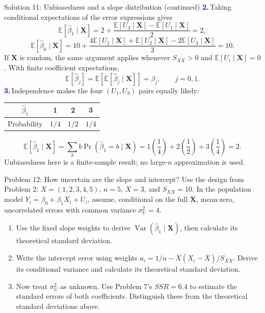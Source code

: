 \documentclass[notes,10pt, aspectratio=169]{beamer}
\newcommand{\E}{\mathbb{E}}
\newcommand{\Var}{\operatorname{Var}}
\newcommand{\answerpart}[1]{\textcolor{blue}{\textbf{#1.}}\,}
\begin{document}
\begin{frame}{Solution 11: Unbiasedness and a slope distribution (continued)}
\small
\answerpart{2}Taking conditional expectations of the error expressions gives
\[
\E[\widehat\beta_1\mid\mathbf X]
=2+\frac{\E[U_3\mid\mathbf X]-\E[U_1\mid\mathbf X]}{2}=\boxed2,
\]
\[
\E[\widehat\beta_0\mid\mathbf X]
=10+\frac{4\E[U_1\mid\mathbf X]+\E[U_2\mid\mathbf X]-2\E[U_3\mid\mathbf X]}3
=\boxed{10}.
\]
If $\mathbf X$ is random, the same argument applies whenever $S_{XX}>0$ and $\E[U_i\mid\mathbf X]=0$. With finite coefficient expectations,
\[
\E[\widehat\beta_j]=\E\!\left[\E[\widehat\beta_j\mid\mathbf X]\right]
=\beta_j,\qquad j=0,1.
\]
\answerpart{3}Independence makes the four $(U_1,U_3)$ pairs equally likely:
\begin{center}
\begin{tabular}{c|ccc}
$\widehat\beta_1$ & 1 & 2 & 3\\ \hline
Probability & $1/4$ & $1/2$ & $1/4$
\end{tabular}
\end{center}
\[
\E[\widehat\beta_1\mid\mathbf X]=\sum_b b\Pr(\widehat\beta_1=b\mid\mathbf X)
=1\!\left(\frac14\right)+2\!\left(\frac12\right)+3\!\left(\frac14\right)=2.
\]
Unbiasedness here is a finite-sample result; no large-$n$ approximation is used.
\end{frame}
\fi

\begin{frame}{Problem 12: How uncertain are the slope and intercept?}
Use the design from Problem 2: $X=(1,2,3,4,5)$, $n=5$, $\overline X=3$, and $S_{XX}=10$. In the population model $Y_i=\beta_0+\beta_1X_i+U_i$, assume, conditional on the full $\mathbf X$, mean-zero, uncorrelated errors with common variance $\sigma_U^2=4$.
\begin{enumerate}
\setlength{\itemsep}{8pt}
\item Use the fixed slope weights to derive $\Var(\widehat\beta_1\mid\mathbf X)$, then calculate its theoretical standard deviation.
\item Write the intercept error using weights $a_i=1/n-\overline X(X_i-\overline X)/S_{XX}$. Derive its conditional variance and calculate its theoretical standard deviation.
\item Now treat $\sigma_U^2$ as unknown. Use Problem 7's $SSR=6.4$ to estimate the standard errors of both coefficients. Distinguish these from the theoretical standard deviations above.
\end{enumerate}
\end{frame}
\end{document}
